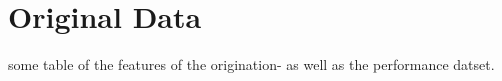 \chapter{Original Data}

some table of the features of the origination- as well as the performance datset. 

